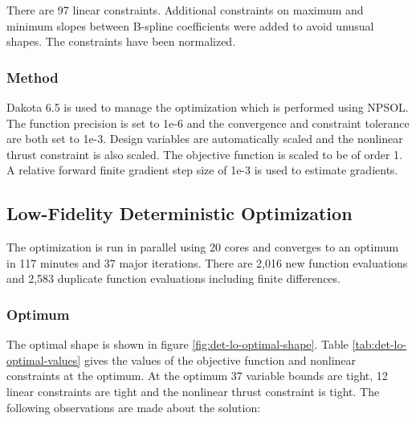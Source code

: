 \documentclass{article}
\begin{document}
There are 97 linear constraints. Additional constraints on maximum and minimum slopes between B-spline coefficients were added to avoid unusual shapes. The constraints have been normalized.

\subsubsection{Method}

Dakota 6.5 is used to manage the optimization which is performed using NPSOL. The function precision is set to 1e-6 and the convergence and constraint tolerance are both set to 1e-3. Design variables are automatically scaled and the nonlinear thrust constraint is also scaled. The objective function is scaled to be of order 1. A relative forward finite gradient step size of 1e-3 is used to estimate gradients.

\subsection{Low-Fidelity Deterministic Optimization}

The optimization is run in parallel using 20 cores and converges to an optimum in 117 minutes and 37 major iterations. There are 2,016 new function evaluations and 2,583 duplicate function evaluations including finite differences.

\subsubsection{Optimum}

The optimal shape is shown in figure \ref{fig:det-lo-optimal-shape}. Table \ref{tab:det-lo-optimal-values} gives the values of the objective function and nonlinear constraints at the optimum. At the optimum 37 variable bounds are tight, 12 linear constraints are tight and the nonlinear thrust constraint is tight. The following observations are made about the solution:
\end{document}
